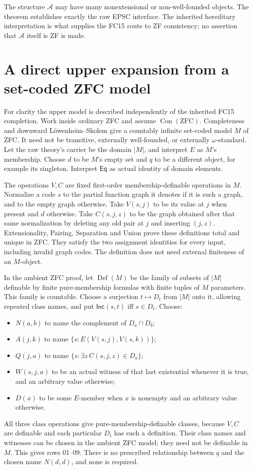 \documentclass[11pt]{article}
\newcommand{\Eq}{\mathsf{Eq}}
\newcommand{\Inc}{\mathsf{Inc}}
\newcommand{\Con}{\operatorname{Con}}
\begin{document}
The structure $\mathcal A$ may have many nonextensional or non-well-founded
objects. The theorem establishes exactly the raw EPSC interface. The
inherited hereditary interpretation is what supplies the FC15 route to
ZF consistency; no assertion that $\mathcal A$ itself is ZF is made.

\section{A direct upper expansion from a set-coded ZFC model}

For clarity the upper model is described independently of the inherited
FC15 completion. Work inside ordinary ZFC and assume $\Con(\mathrm{ZFC})$.
Completeness and downward L\"owenheim--Skolem give a countably infinite
set-coded model $M$ of ZFC. It need not be transitive, externally
well-founded, or externally $\omega$-standard. Let the raw theory's
carrier be the domain $|M|$, and interpret $E$ as $M$'s membership.
Choose $d$ to be $M$'s empty set and $q$ to be a different object,
for example its singleton. Interpret $\Eq$ as actual identity of domain
elements.

The operations $V,C$ are fixed first-order membership-definable
operations in $M$. Normalize a code $s$ to the partial function graph
it denotes if it is such a graph, and to the empty graph otherwise.
Take $V(s,j)$ to be its value at $j$ when present and $d$ otherwise.
Take $C(s,j,z)$ to be the graph obtained after that same normalization
by deleting any old pair at $j$ and inserting $(j,z)$. Extensionality,
Pairing, Separation and Union prove these definitions total and unique
in ZFC. They satisfy the two assignment identities for every input,
including invalid graph codes. The definition does not need external
finiteness of an $M$-object.

In the ambient ZFC proof, let $\operatorname{Def}(M)$ be the family of
subsets of $|M|$ definable by finite pure-membership formulas with finite
tuples of $M$ parameters. This family is countable. Choose a surjection
$t\mapsto D_t$ from $|M|$ onto it, allowing repeated class names, and put
$\Inc(s,t)$ iff $s\in D_t$. Choose:
\begin{itemize}
\item $N(a,b)$ to name the complement of $D_a\cap D_b$;
\item $A(j,k)$ to name $\{s:E(V(s,j),V(s,k))\}$;
\item $Q(j,a)$ to name $\{s:\exists z\ C(s,j,z)\in D_a\}$;
\item $W(s,j,a)$ to be an actual witness of that last existential
whenever it is true, and an arbitrary value otherwise;
\item $D(x)$ to be some $E$-member when $x$ is nonempty and an
arbitrary value otherwise.
\end{itemize}
All three class operations give pure-membership-definable classes,
because $V,C$ are definable and each particular $D_t$ has such a
definition. Their class names and witnesses can be chosen in the ambient
ZFC model; they need not be definable in $M$. This gives rows 01--09.
There is no prescribed relationship between $q$ and the chosen name
$N(d,d)$, and none is required.
\end{document}
